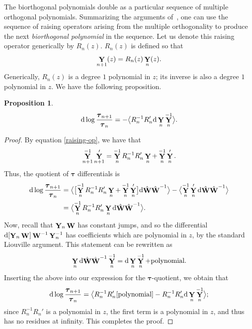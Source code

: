 \documentclass[10pt,a4paper]{amsart}
\DeclareMathOperator{\YY}{{\bf Y}}
\DeclareMathOperator{\WW}{{\bf W}}
\numberwithin{equation}{section}
\newtheorem{Proposition}[Theorem]{Proposition}
 { \theoremstyle{definition}
\newtheorem{Definition}[Theorem]{Definition}
\newtheorem{Note}[Theorem]{Note}
\newtheorem{Example}[Theorem]{Example}
\newtheorem{Remark}[Theorem]{Remark} }
\begin{document}
The biorthogonal polynomials double as a particular sequence of multiple orthogonal polynomials. Summarizing the arguments of~\cite{Bertola-Marchal}, one can use the sequence of raising operators arising from the multiple orthogonality to produce the next \textit{biorthogonal polynomial} in the sequence. Let us
denote this raising operator generically by $R_n(z)$. $R_n(z)$ is defined so that
 \begin{equation}\label{raising-op}
 \YY_{n+1}(z) = R_{n}(z) \YY_n(z).
 \end{equation}
Generically, $R_n(z)$ is a degree $1$ polynomial in $z$; its inverse is also a degree $1$ polynomial in $z$. We have the following proposition.
\begin{Proposition}
 \begin{equation*}
 {\rm d}\log\frac{\boldsymbol{\tau}_{n+1}}{\boldsymbol{\tau}_{n}} = -\bigl\langle R_n^{-1} R_n' {\rm d}\YY_n \YY^{-1}_n\bigr\rangle.
 \end{equation*}
\end{Proposition}
 \begin{proof}
 By equation \eqref{raising-op}, we have that
 \begin{equation*}
 \YY_{n+1}^{-1} \YY_{n+1}' = \YY_n^{-1} R_n^{-1} R_n'\YY_n + \YY_n^{-1}\YY_n'.
 \end{equation*}
 Thus, the quotient of $\boldsymbol{\tau}$ differentials is
 \begin{align*}
 \begin{split}
 {\rm d}\log\frac{\boldsymbol{\tau}_{n+1}}{\boldsymbol{\tau}_{n}} &= \bigl\langle \bigl[\YY_n^{-1} R_n^{-1} R_n'\YY_n + \YY_n^{-1}\YY_n'\bigr] {\rm d}\hat{\WW}\hat{\WW}^{-1}\bigr\rangle - \bigl\langle \YY_n^{-1}\YY_n' {\rm d}\hat{\WW} \hat{\WW}^{-1} \bigr\rangle\\
 &=\bigl\langle\YY_n^{-1} R_n^{-1} R_n'\YY_n {\rm d}\hat{\WW}\hat{\WW}^{-1}\bigr\rangle.
 \end{split}
 \end{align*}
 Now, recall that $\YY_n \WW$ has constant jumps, and so the differential ${\rm d}[\YY_n \WW]\WW^{-1} \YY_n^{-1}$ has coefficients which
 are polynomial in $z$, by the standard Liouville argument. This statement can be rewritten as
 \begin{equation*}
 \YY_n {\rm d}\hat{\WW}\hat{\WW}^{-1} \YY_n^{-1} = {\rm d}\YY_n \YY_n^{-1} + \text{polynomial}.
 \end{equation*}
 Inserting the above into our expression for the $\boldsymbol{\tau}$-quotient, we obtain that
 \begin{equation*}
 {\rm d}\log\frac{\boldsymbol{\tau}_{n+1}}{\boldsymbol{\tau}_{n}} = \bigl\langle R_n^{-1}R_n'[\text{polynomial}] - R_n^{-1}R_n' {\rm d}\YY_n\YY_n^{-1}\bigr\rangle;
 \end{equation*}
 since $R_n^{-1}R_n'$ is a polynomial in $z$, the first term is a polynomial in $z$, and thus has no residues at infinity. This completes the proof.
 \end{proof}
\end{document}
